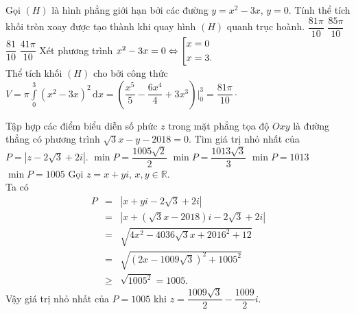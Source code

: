 \begin{ex}%
	Gọi $ (H) $ là hình phẳng giới hạn bởi các đường $ y=x^2-3x $, $ y=0 $. Tính thể tích khối tròn xoay được tạo thành khi quay hình $ (H) $ quanh trục hoành.
	\choice
	{\True $ \dfrac{81\pi}{10} $}
	{$ \dfrac{85\pi}{10} $}
	{$ \dfrac{81}{10} $}
	{$ \dfrac{41\pi}{10} $}
	\loigiai
	{Xét phương trình $ x^2-3x=0 \Leftrightarrow \left[\begin{aligned}&x=0\\&x=3.\end{aligned}\right. $\\Thể tích khối $ (H) $ cho bởi công thức $ V = \pi \displaystyle \int \limits_0^3 (x^2-3x)^2 \mathrm{\,d}x = \left(\dfrac{x^5}{5}-\dfrac{6x^4}{4}+3x^3\right)\bigg|_0^3 = \dfrac{81\pi}{10}\cdot $
	}
\end{ex}
\begin{ex}%
Tập hợp các điểm biểu diễn số phức $ z $ trong mặt phẳng tọa độ $ Oxy $ là đường thẳng có phương trình $ \sqrt{3}x-y-2018=0 $. Tìm giá trị nhỏ nhất của $ P=\left|z-2\sqrt{3}+2i\right| $.
	\choice
	{$ \min P = \dfrac{1005\sqrt{2}}{2} $}
	{$ \min P = \dfrac{1013\sqrt{3}}{3} $}
	{$ \min P = 1013 $}
	{\True $ \min P = 1005 $}
	\loigiai
	{Gọi $ z=x+yi $, $ x,y \in \mathbb{R} $.\\
		Ta có \begin{eqnarray*}
P&=&\left|x+yi-2\sqrt{3}+2i\right| \\&=& 
\left|x+\left(\sqrt{3}x-2018\right)i-2\sqrt{3}+2i\right|\\&=& \sqrt{4x^2 -4036\sqrt{3}x+2016^2+12}	\\
&=& \sqrt{\left(2x-1009\sqrt{3}\right)^2+1005^2}\\&\ge& \sqrt{1005^2}=1005.	\end{eqnarray*} 
Vậy giá trị nhỏ nhất của $ P = 1005 $ khi $z= \dfrac{1009\sqrt{3}}{2} -\dfrac{1009}{2}i. $
	}
\end{ex}
